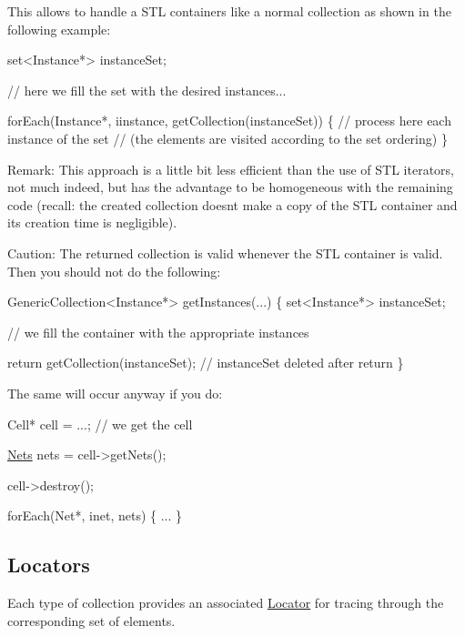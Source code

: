 This allows to handle a S\+TL containers like a normal collection as shown in the following example\+: 
\begin{DoxyCode}
set<Instance*> instanceSet;
 
\textcolor{comment}{// here we fill the set with the desired instances... }
 
forEach(Instance*, iinstance, getCollection(instanceSet)) \{
   \textcolor{comment}{// process here each instance of the set}
   \textcolor{comment}{// (the elements are visited according to the set ordering)}
\}
\end{DoxyCode}


\begin{DoxyParagraph}{Remark\+:}
This approach is a little bit less efficient than the use of S\+TL iterators, not much indeed, but has the advantage to be homogeneous with the remaining code (recall\+: the created collection doesn\textquotesingle{}t make a copy of the S\+TL container and its creation time is negligible).
\end{DoxyParagraph}
\begin{DoxyParagraph}{Caution\+:}
The returned collection is valid whenever the S\+TL container is valid. Then you should not do the following\+: 
\begin{DoxyCode}
GenericCollection<Instance*> getInstances(...)
\{
   set<Instance*> instanceSet;
 
   \textcolor{comment}{// we fill the container with the appropriate instances}
 
   \textcolor{keywordflow}{return} getCollection(instanceSet); \textcolor{comment}{// instanceSet deleted after return}
\}
\end{DoxyCode}

\end{DoxyParagraph}
The same will occur anyway if you do\+: 
\begin{DoxyCode}
Cell* cell = ...; \textcolor{comment}{// we get the cell}
 
\hyperlink{namespaceHurricane_a3404a8b17130a1824f4a281704b04df7}{Nets} nets = cell->getNets();
 
cell->destroy();
 
forEach(Net*, inet, nets) \{
   ...
\}
\end{DoxyCode}
\hypertarget{classHurricane_1_1Collection_secCollectionLocators}{}\subsection{Locators}\label{classHurricane_1_1Collection_secCollectionLocators}
Each type of collection provides an associated \hyperlink{classHurricane_1_1Locator}{Locator} for tracing through the corresponding set of elements.

